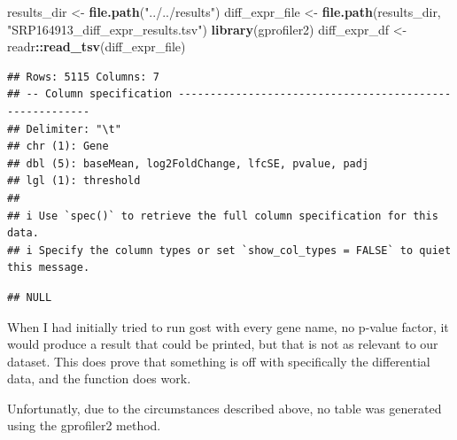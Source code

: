 \documentclass[
]{article}
\newenvironment{Shaded}{\begin{snugshade}}{\end{snugshade}}
\newcommand{\AttributeTok}[1]{\textcolor[rgb]{0.13,0.29,0.53}{#1}}
\newcommand{\ConstantTok}[1]{\textcolor[rgb]{0.56,0.35,0.01}{#1}}
\newcommand{\FloatTok}[1]{\textcolor[rgb]{0.00,0.00,0.81}{#1}}
\newcommand{\FunctionTok}[1]{\textcolor[rgb]{0.13,0.29,0.53}{\textbf{#1}}}
\newcommand{\NormalTok}[1]{#1}
\newcommand{\OtherTok}[1]{\textcolor[rgb]{0.56,0.35,0.01}{#1}}
\newcommand{\SpecialCharTok}[1]{\textcolor[rgb]{0.81,0.36,0.00}{\textbf{#1}}}
\newcommand{\StringTok}[1]{\textcolor[rgb]{0.31,0.60,0.02}{#1}}
\begin{document}
\begin{Shaded}
\begin{Highlighting}[]
\NormalTok{results\_dir }\OtherTok{\textless{}{-}} \FunctionTok{file.path}\NormalTok{(}\StringTok{"../../results"}\NormalTok{)}
\NormalTok{diff\_expr\_file }\OtherTok{\textless{}{-}} \FunctionTok{file.path}\NormalTok{(results\_dir, }\StringTok{"SRP164913\_diff\_expr\_results.tsv"}\NormalTok{)}
\FunctionTok{library}\NormalTok{(gprofiler2)}
\NormalTok{diff\_expr\_df }\OtherTok{\textless{}{-}}\NormalTok{ readr}\SpecialCharTok{::}\FunctionTok{read\_tsv}\NormalTok{(diff\_expr\_file)}
\end{Highlighting}
\end{Shaded}

\begin{verbatim}
## Rows: 5115 Columns: 7
## -- Column specification --------------------------------------------------------
## Delimiter: "\t"
## chr (1): Gene
## dbl (5): baseMean, log2FoldChange, lfcSE, pvalue, padj
## lgl (1): threshold
## 
## i Use `spec()` to retrieve the full column specification for this data.
## i Specify the column types or set `show_col_types = FALSE` to quiet this message.
\end{verbatim}

\begin{Shaded}
\end{Shaded}

\begin{verbatim}
## NULL
\end{verbatim}

When I had initially tried to run gost with every gene name, no p-value
factor, it would produce a result that could be printed, but that is not
as relevant to our dataset. This does prove that something is off with
specifically the differential data, and the function does work.

Unfortunatly, due to the circumstances described above, no table was
generated using the gprofiler2 method.
\end{document}
